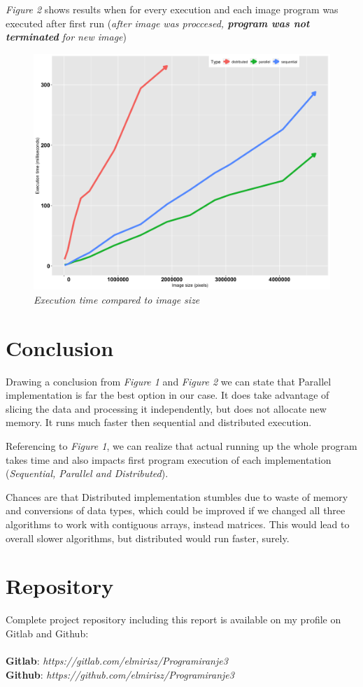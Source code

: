 \documentclass{article}
\begin{document}
\textit{Figure 2} shows results when for every execution and each image program was executed after first run (\textit{after image was proccesed, \textbf{program was not terminated } for new image})
\\
\setlength{\textfloatsep}{0pt}
\begin{figure}[h]
  \includegraphics[width=\linewidth]{bigAfter.png}
  \caption{\textit{Execution time compared to image size}}
\end{figure}

\section{Conclusion}

Drawing a conclusion from \textit{Figure 1} and \textit{Figure 2 } we can state that Parallel implementation is far the best option in our case. It does take advantage of slicing the data and processing it independently, but does not allocate new memory. It runs much faster then sequential and distributed execution.

 Referencing to \textit{Figure 1}, we can realize that actual running up  the whole program takes time and also impacts first program execution of each implementation (\textit{Sequential, Parallel and Distributed}). 
 
 Chances are that Distributed implementation stumbles due to waste of memory and conversions of data types, which could be improved if we changed all three algorithms to work with contiguous arrays, instead matrices. This would lead to overall slower algorithms, but distributed would run faster, surely.
 
 \section{Repository}
Complete project repository including this report is available on my profile on Gitlab and Github: 
\\ 
\\
\textbf{Gitlab}: \textit{https://gitlab.com/elmirisz/Programiranje3}
\\
\textbf{Github}: \textit{https://github.com/elmirisz/Programiranje3}
\end{document}
